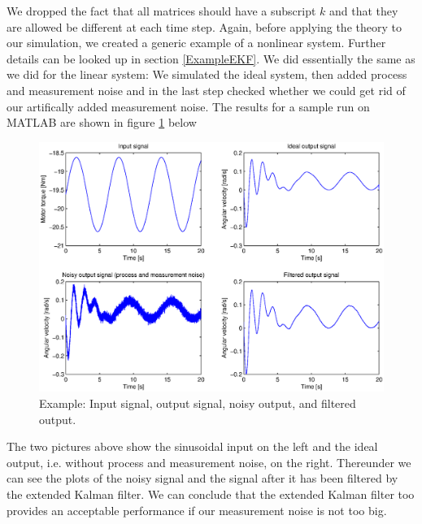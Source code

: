 We dropped the fact that all matrices should have a subscript \(k\) and that they are allowed be different at each time step. Again, before applying the theory to our simulation, we created a generic example of a nonlinear system. Further details can be looked up in section \ref{ExampleEKF}. We did essentially the same as we did for the linear system: We simulated the ideal system, then added process and measurement noise and in the last step checked whether we could get rid of our artifically added measurement noise. The results for a sample run on MATLAB are shown in figure \ref{EKFchart} below

\begin{figure}[htbp]
	\centering
    	\includegraphics[width=12cm]{./3_KalmanFilterTheory/EKFchart.eps}
  	\caption{Example: Input signal, output signal, noisy output, and filtered output.}
  	\label{EKFchart}
\end{figure}

The two pictures above show the sinusoidal input on the left and the ideal output, i.e. without process and measurement noise, on the right. Thereunder we can see the plots of the noisy signal and the signal after it has been filtered by the extended Kalman filter. We can conclude that the extended Kalman filter too provides an acceptable performance if our measurement noise is not too big.


